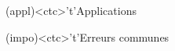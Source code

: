 \documentclass[../../main/main.tex]{subfiles}
\begin{document}
\begin{tcn}[sidebyside, fontupper=\small, fontlower=\small]
	\begin{tcn}(appl)<ctc>'t'{Applications}
	\end{tcn}
	\begin{tcn}(impo)<ctc>'t'{Erreurs communes}
	\end{tcn}
\end{tcn}

\vspace*{\fill}
\end{document}
